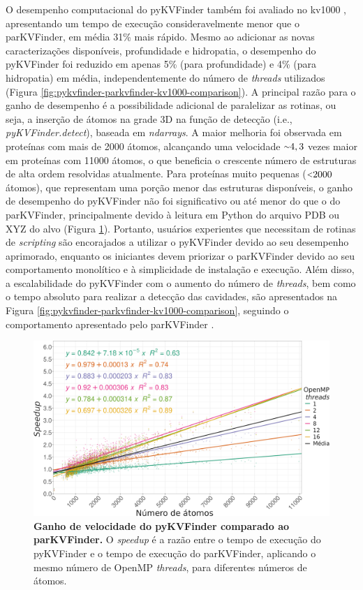 \documentclass[Portugues]{phdquali}
\newcommand{\aproximadamente}{\raise.2ex\hbox{$\scriptstyle\sim$}}
\newcommand{\less}{\raise.2ex\hbox{$\scriptstyle{<}$}}
\def\ie{i.e.\onedot}
\begin{document}
O desempenho computacional do pyKVFinder também foi avaliado no kv1000 \cite{guerra2020}, apresentando um tempo de execução consideravelmente menor que o parKVFinder, em média 31\% mais rápido. Mesmo ao adicionar as novas caracterizações disponíveis, profundidade e hidropatia, o desempenho do pyKVFinder foi reduzido em apenas 5\% (para profundidade) e 4\% (para hidropatia) em média, independentemente do número de \textit{threads} utilizados (Figura \ref{fig:pykvfinder-parkvfinder-kv1000-comparison}). A principal razão para o ganho de desempenho é a possibilidade adicional de paralelizar as rotinas, ou seja, a inserção de átomos na grade 3D na função de detecção (\ie, \textit{pyKVFinder.detect}), baseada em \textit{ndarrays}. A maior melhoria foi observada em proteínas com mais de 2000 átomos, alcançando uma velocidade $\aproximadamente4,3$ vezes maior em proteínas com 11000 átomos, o que beneficia o crescente número de estruturas de alta ordem resolvidas atualmente. Para proteínas muito pequenas ($\less2000$ átomos), que representam uma porção menor das estruturas disponíveis, o ganho de desempenho do pyKVFinder não foi significativo ou até menor do que o do parKVFinder, principalmente devido à leitura em Python do arquivo PDB ou XYZ do alvo (Figura \ref{fig:pykvfinder-speedup}). Portanto, usuários experientes que necessitam de rotinas de \textit{scripting} são encorajados a utilizar o pyKVFinder devido ao seu desempenho aprimorado, enquanto os iniciantes devem priorizar o parKVFinder devido ao seu comportamento monolítico e à simplicidade de instalação e execução. Além disso, a escalabilidade do pyKVFinder com o aumento do número de \textit{threads}, bem como o tempo absoluto para realizar a detecção das cavidades, são apresentados na Figura \ref{fig:pykvfinder-parkvfinder-kv1000-comparison}, seguindo o comportamento apresentado pelo parKVFinder \cite{guerra2020}.

\begin{figure}[ht]
  \centering
  \includegraphics[scale=0.8]{images/pykvfinder-speedup.png}
  \caption[Ganho de velocidade do pyKVFinder comparado ao parKVFinder]{\textbf{Ganho de velocidade do pyKVFinder comparado ao parKVFinder.} O \textit{speedup} é a razão entre o tempo de execução do pyKVFinder e o tempo de execução do parKVFinder, aplicando o mesmo número de OpenMP \textit{threads}, para diferentes números de átomos.}
  \label{fig:pykvfinder-speedup}
\end{figure}
\end{document}
